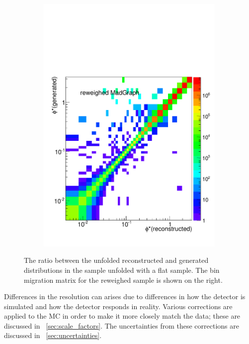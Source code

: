 \begin{figure}[!htbp]
\begin{subfigure}[b]{\SideBySidePlotWidth}
        \includegraphics[width=\textwidth]{figures/BinM_M_flat.pdf}
        \caption{}
        \label{fig:unfolding_flat_bin_migration}
    \end{subfigure}
    \caption[
        The ratio between the unfolded reconstructed and generated \phistar
        distributions in the \POWHEG sample unfolded with a flat \MADGRAPH
        sample.
    ]{
        The ratio between the unfolded reconstructed and generated \phistar
        distributions in the \POWHEG sample unfolded with a flat \MADGRAPH
        sample. The bin migration matrix for the reweighed \MADGRAPH sample is
        shown on the right.
    }
    \label{fig:flat_unfolding}
\end{figure}

Differences in the resolution can arises due to differences in how the
detector is simulated and how the detector responds in reality. Various
corrections are applied to the MC in order to make it more closely match the
data; these are discussed in \SEC~\ref{sec:scale_factors}. The uncertainties
from these corrections are discussed in \SEC~\ref{sec:uncertainties}.

